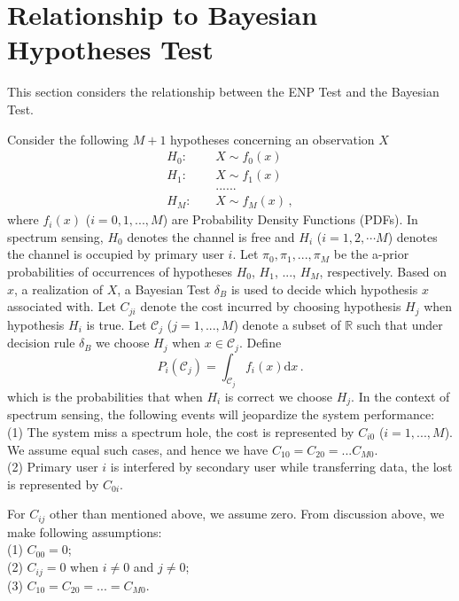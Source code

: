 \section{Relationship to Bayesian Hypotheses Test}
This section considers  the relationship between the ENP Test and the Bayesian Test. 

Consider the following $M+1$ hypotheses concerning an observation $X$
\begin{equation}
\label{equ: 2 pdf}
\begin{split}
H_0:\;\;\;\;&X \sim f_0(x)\\
H_1:\;\;\;\;&X \sim f_1(x)\\
&......\\
H_{M}:\;\;\;\;&X \sim f_M(x)\,,
\end{split}
\end{equation}
where $f_i(x)$ ($i=0, 1, ..., M$) are Probability Density Functions (PDFs). 
In spectrum sensing, $H_0$ denotes the channel is free and $H_i$ ($i = 1, 2, \cdots M$) denotes the channel is occupied by primary user $i$. 
Let $\pi_0, \pi_1, ..., \pi_M$ be the a-prior probabilities of occurrences of hypotheses $H_0$, $H_1$, ..., $H_M$, respectively. 
Based on $x$, a realization of $X$, a Bayesian Test $\delta_B$ is used to decide which hypothesis $x$ associated with.  
Let $C_{ji}$ denote the cost incurred by choosing hypothesis $H_j$ when hypothesis $H_i$ is true. 
Let $\mathcal{C}_j$ ($j=1, ..., M$) denote a subset of $\mathbb{R}$ such that under decision rule $\delta_B$ we choose $H_j$ when $x \in \mathcal{C}_j$. 
Define
\[
P_i(\mathcal{C}_j) = \int_{\mathcal{C}_j} f_i(x)\mathrm{d}x\,.
\]
which is the probabilities that when $H_i$ is correct we choose $H_j$.
In the context of spectrum sensing, the following events will jeopardize the system performance:
\\(1) The system miss a spectrum hole, the cost is represented by $C_{i0}$ ($i = 1, ..., M$). We assume equal such cases, and hence we have $C_{10} = C_{20} = ... C_{M0}$.
\\(2) Primary user $i$ is interfered by secondary user while transferring data, the lost is represented by $C_{0i}$. 

For $C_{ij}$ other than mentioned above, we assume zero. 
From discussion above,  we make following assumptions:
\\(1) $C_{00} = 0$;
\\(2) $C_{ij} = 0$ when $i \neq 0$ and $j \neq 0$;
\\(3) $C_{10} = C_{20} = ... = C_{M0}$.

